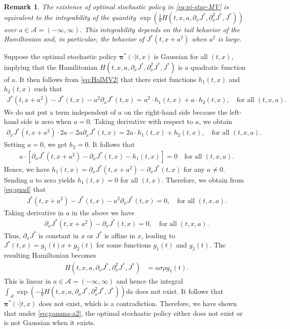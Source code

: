 \documentclass[11pt]{article}
\newtheorem{remark}{Remark}
\newcommand{\1}{\mathbbm{1}}
\begin{document}
\begin{remark}
The existence of optimal stochastic policy in \eqref{eq:pi-star-MV} is equivalent to the integrability of the quantity $\exp(\frac{1}{\theta} H(t,x, a, \partial_xJ^*,  \partial_x^2J^*, J^*))$ over $a \in \mathcal{A} = (-\infty, \infty)$. This integrability depends on the tail behavior of the Hamiltonian and, in particular, the behavior of $J^*(t, x+ a^2)$ when $a^2$ is large.
\end{remark}

Suppose the optimal stochastic policy $\boldsymbol{\pi}^*(\cdot|t,x)$ is Gaussian for all $(t,x)$, implying that  the Hamilitonian $H(t,x, a, \partial_xJ^*,  \partial_x^2J^*, J^*)$ is a quadratic function of $a$.
It then follows from \eqref{eq:HalMV2} that  there exist functions $h_1(t,x)$ and $h_2(t,x)$ such that
\begin{align}\label{eq:quad}
	J^*(t, x+  a^2 ) - J^*(t,x) - a^2 \partial_xJ^*(t,x) = a^2 \cdot h_1(t,x) + a \cdot h_2(t,x), \quad \text{for all $(t,x,a)$}.
\end{align}
We do not put a term independent of $a$ on the right-hand side because the left-hand side is zero when $a=0$.
Taking derivative with respect to $a$, we obtain
\begin{align}
	\partial_xJ^*(t, x+  a^2 ) \cdot 2a - 2a \partial_xJ^*(t,x) =  2a \cdot h_1(t,x) + h_2(t,x), \quad \text{for all $(t,x,a)$}.
\end{align}
Setting $a=0$, we get $h_2 = 0.$ It follows that
\begin{align}
	a \cdot \left[ \partial_xJ^*(t, x+  a^2 )  -  \partial_xJ^*(t,x) -   h_1(t,x)  \right] = 0  \quad \text{for all $(t,x, a)$}.
\end{align}
Hence, we have $h_1(t,x) = \partial_xJ^*(t, x+  a^2 )  -  \partial_xJ^*(t,x) $ for any $a \ne 0.$  Sending $a$ to zero yields $h_1(t,x) =0$ for all $(t,x)$. Therefore, we obtain from \eqref{eq:quad} that
\begin{align}
	J^*(t, x+  a^2 ) - J^*(t,x) - a^2 \partial_xJ^*(t,x) = 0, \quad \text{for all $(t,x,a)$}.
\end{align}
Taking derivative in $a$ in the above we have
\begin{align}
	\partial_xJ^*(t, x+  a^2 ) -  \partial_xJ^*(t,x) = 0, \quad \text{for all $(t,x,a)$}.
\end{align}
Thus, $\partial_xJ^*$ is constant in $x$ or $J^*$ is affine in $x$, leading to
$J^*(t,x) = g_1(t) x + g_2(t)$ for some functions $g_1(t)$ and $g_2(t)$. The resulting Hamiltonian becomes
\begin{align}
	H(t,x, a, \partial_xJ^*,  \partial_x^2J^*, J^*)&= a\sigma\rho g_1(t).
\end{align}
This is linear in $a \in \mathcal{A} = (-\infty, \infty)$ and hence the integral $\int_{\mathcal{A}}\exp(-\frac{1}{\theta} H(t,x, a, \partial_xJ^*,  \partial_x^2J^*, J^*)) da$ does not exist. It follows that $\boldsymbol{\pi}^*(\cdot| t, x)$ does not exist, which is a contradiction. Therefore, we have shown  that under \eqref{eq:gamma-a2}, the optimal stochastic policy either does not exist or is not Gaussian when it exists.
\end{document}
